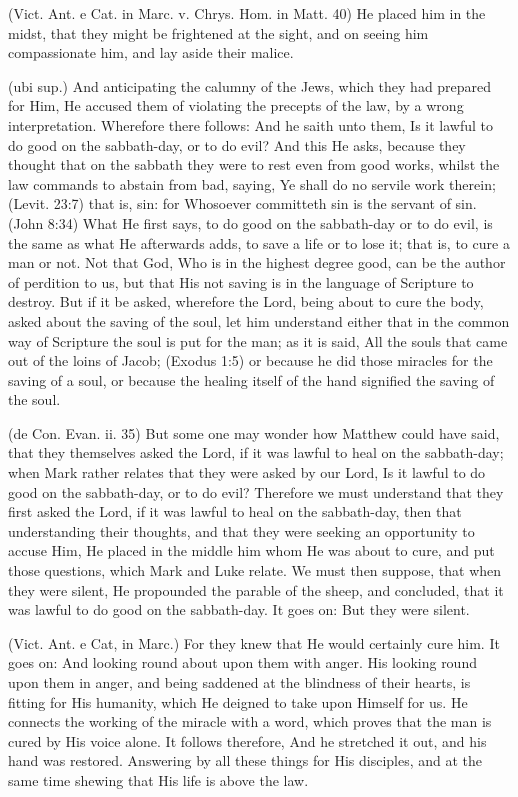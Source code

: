  (Vict. Ant. e Cat. in Marc. v. Chrys. Hom. in Matt. 40) He placed him in the midst, that they might be frightened at the sight, and on seeing him compassionate him, and lay aside their malice.

 (ubi sup.) And anticipating the calumny of the Jews, which they had prepared for Him, He accused them of violating the precepts of the law, by a wrong interpretation. Wherefore there follows: And he saith unto them, Is it lawful to do good on the sabbath-day, or to do evil? And this He asks, because they thought that on the sabbath they were to rest even from good works, whilst the law commands to abstain from bad, saying, Ye shall do no servile work therein; (Levit. 23:7) that is, sin: for Whosoever committeth sin is the servant of sin. (John 8:34) What He first says, to do good on the sabbath-day or to do evil, is the same as what He afterwards adds, to save a life or to lose it; that is, to cure a man or not. Not that God, Who is in the highest degree good, can be the author of perdition to us, but that His not saving is in the language of Scripture to destroy. But if it be asked, wherefore the Lord, being about to cure the body, asked about the saving of the soul, let him understand either that in the common way of Scripture the soul is put for the man; as it is said, All the souls that came out of the loins of Jacob; (Exodus 1:5) or because he did those miracles for the saving of a soul, or because the healing itself of the hand signified the saving of the soul.

 (de Con. Evan. ii. 35) But some one may wonder how Matthew could have said, that they themselves asked the Lord, if it was lawful to heal on the sabbath-day; when Mark rather relates that they were asked by our Lord, Is it lawful to do good on the sabbath-day, or to do evil? Therefore we must understand that they first asked the Lord, if it was lawful to heal on the sabbath-day, then that understanding their thoughts, and that they were seeking an opportunity to accuse Him, He placed in the middle him whom He was about to cure, and put those questions, which Mark and Luke relate. We must then suppose, that when they were silent, He propounded the parable of the sheep, and concluded, that it was lawful to do good on the sabbath-day. It goes on: But they were silent.

 (Vict. Ant. e Cat, in Marc.) For they knew that He would certainly cure him. It goes on: And looking round about upon them with anger. His looking round upon them in anger, and being saddened at the blindness of their hearts, is fitting for His humanity, which He deigned to take upon Himself for us. He connects the working of the miracle with a word, which proves that the man is cured by His voice alone. It follows therefore, And he stretched it out, and his hand was restored. Answering by all these things for His disciples, and at the same time shewing that His life is above the law.

